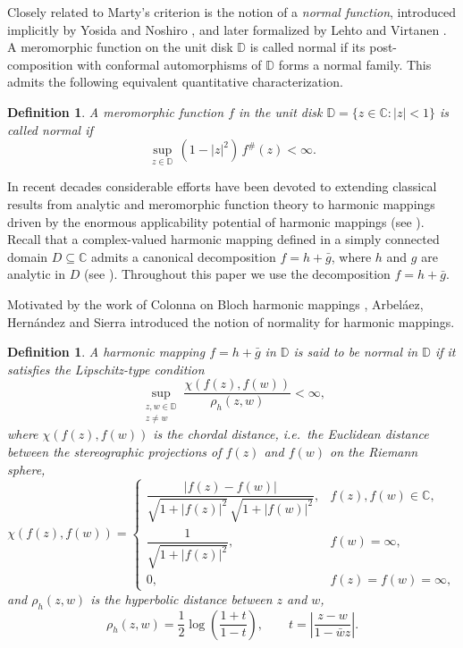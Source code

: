 \documentclass[10pt,a4paper]{amsart}
\newtheorem{definition}[theorem]{Definition}
\newcommand{\D}{\mathbb{D}}
\newcommand{\C}{\mathbb{C}}
\begin{document}
Closely related to Marty's criterion is the notion of a \emph{normal function}, introduced
implicitly by Yosida \cite{Yosida} and Noshiro \cite{Noshiro}, and later formalized by
Lehto and Virtanen \cite{LehtoVirtanen}. A meromorphic function on the unit disk $\D$ is
called normal if its post-composition with conformal automorphisms of $\D$ forms a normal
family. This admits the following equivalent quantitative characterization.

\begin{definition}\label{def:normalmero}
A meromorphic function $f$ in the unit disk $\D=\{z\in\C:|z|<1\}$ is called \emph{normal} if
\[
\sup_{z\in\D}\,(1-|z|^{2})\,f^{\#}(z)<\infty.
\]
\end{definition}

In recent decades considerable efforts have been devoted to extending classical results from
analytic and meromorphic function theory to harmonic mappings driven by the enormous applicability potential of harmonic mappings (see \cite{ACA, OCM}). Recall that a complex-valued harmonic mapping defined in a simply connected domain $D\subseteq\C$ admits a canonical
decomposition $f=h+\bar g$, where $h$ and $g$ are analytic in $D$ (see \cite{Duren}).
Throughout this paper we use the decomposition $f=h+\bar g$.

Motivated by the work of Colonna on Bloch harmonic mappings \cite{Colonna}, Arbel\'aez,
Hern\'andez and Sierra \cite{AHS} introduced the notion of normality for harmonic mappings.

\begin{definition}\label{def:normalharm}
A harmonic mapping $f=h+\bar g$ in $\D$ is said to be \emph{normal} in $\D$ if it satisfies
the Lipschitz-type condition
\[
\sup_{\substack{z,w\in\D\\ z\neq w}}\frac{\chi(f(z),f(w))}{\rho_{h}(z,w)}<\infty,
\]
where $\chi(f(z),f(w))$ is the chordal distance, i.e.\ the Euclidean distance between the
stereographic projections of $f(z)$ and $f(w)$ on the Riemann sphere,
\[
\chi(f(z),f(w))=
\begin{cases}
\dfrac{|f(z)-f(w)|}{\sqrt{1+|f(z)|^{2}}\,\sqrt{1+|f(w)|^{2}}}, & f(z),f(w)\in\C,\\[2.2ex]
\dfrac{1}{\sqrt{1+|f(z)|^{2}}}, & f(w)=\infty,\\[2.2ex]
0, & f(z)=f(w)=\infty,
\end{cases}
\]
and $\rho_{h}(z,w)$ is the hyperbolic distance between $z$ and $w$,
\[
\rho_{h}(z,w)=\frac12\log\!\left(\frac{1+t}{1-t}\right),\qquad
t=\left|\frac{z-w}{1-\bar w z}\right|.
\]
\end{definition}
\end{document}
